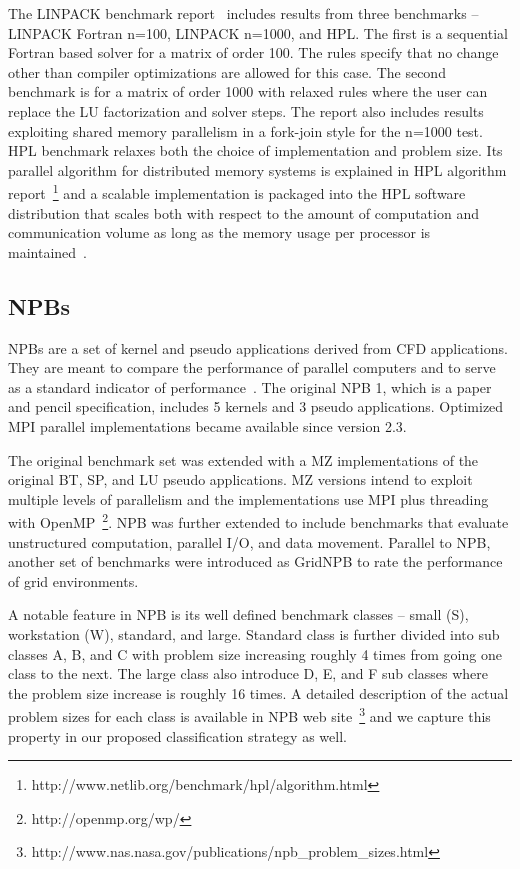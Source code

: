 The \acs{LINPACK} benchmark report~\cite{Dongarra:1992:PVC:141868.141871} includes results from three benchmarks – \acs{LINPACK} Fortran n=100, \acs{LINPACK} n=1000, and \acs{HPL}. The first is a sequential Fortran based solver for a matrix of order 100. The rules specify that no change other than compiler optimizations are allowed for this case. The second benchmark is for a matrix of order 1000 with relaxed rules where the user can replace the \ac{LU} factorization and solver steps. The report also includes results exploiting shared memory parallelism in a fork-join style for the n=1000 test. \ac{HPL} benchmark relaxes both the choice of implementation and problem size. Its parallel algorithm for distributed memory systems is explained in \ac{HPL} algorithm report~\footnote{http://www.netlib.org/benchmark/hpl/algorithm.html} and a scalable implementation is packaged into the \ac{HPL} software distribution that scales both with respect to the amount of computation and communication volume as long as the memory usage per processor is maintained~\cite{Dongarra03thelinpack}. 

\subsection{\acp{NPB}}
\acp{NPB} are a set of kernel and pseudo applications derived from \ac{CFD} applications. They are meant to compare the performance of parallel computers and to serve as a standard indicator of performance~\cite{4912932}. The original \ac{NPB} 1, which is a paper and pencil specification, includes 5 kernels and 3 pseudo applications. Optimized \ac{MPI} parallel implementations became available since version 2.3.

The original benchmark set was extended with a \ac{MZ} implementations of the original \ac{BT}, \ac{SP}, and \ac{LU} pseudo applications. \ac{MZ} versions intend to exploit multiple levels of parallelism and the implementations use  MPI plus threading with OpenMP~\footnote{http://openmp.org/wp/}. \ac{NPB} was further extended to include benchmarks that evaluate unstructured computation, parallel I/O, and data movement. Parallel to NPB, another set of benchmarks were introduced as \acs{GridNPB} to rate the performance of grid environments. 

A notable feature in \ac{NPB} is its well defined benchmark classes – small (S), workstation (W), standard, and large. Standard class is further divided into sub classes A, B, and C with problem size increasing roughly 4 times from going one class to the next. The large class also introduce D, E, and F sub classes where the problem size increase is roughly 16 times. A detailed description of the actual problem sizes for each class is available in \ac{NPB} web site~\footnote{http://www.nas.nasa.gov/publications/npb_problem_sizes.html} and we capture this property in our proposed classification strategy as well.

